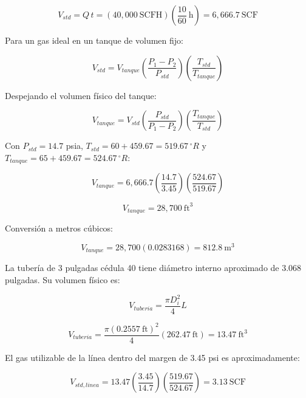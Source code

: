 \documentclass[12pt,letterpaper]{article}
\begin{document}
\begin{equation}
    V_{std}=Q\,t=(40{,}000\ \text{SCFH})\left(\frac{10}{60}\ \text{h}\right)=6{,}666.7\ \text{SCF}
\end{equation}

Para un gas ideal en un tanque de volumen fijo:

\begin{equation}
    V_{std}=V_{tanque}\left(\frac{P_1-P_2}{P_{std}}\right)\left(\frac{T_{std}}{T_{tanque}}\right)
\end{equation}

Despejando el volumen físico del tanque:

\begin{equation}
    V_{tanque}=V_{std}\left(\frac{P_{std}}{P_1-P_2}\right)\left(\frac{T_{tanque}}{T_{std}}\right)
\end{equation}

Con $P_{std}=14.7$ psia, $T_{std}=60+459.67=519.67\,^\circ R$ y $T_{tanque}=65+459.67=524.67\,^\circ R$:

\begin{equation}
    V_{tanque}=6{,}666.7\left(\frac{14.7}{3.45}\right)\left(\frac{524.67}{519.67}\right)
\end{equation}

\begin{equation}
    V_{tanque}=28{,}700\ \text{ft}^3
\end{equation}

Conversión a metros cúbicos:

\begin{equation}
    V_{tanque}=28{,}700(0.0283168)=812.8\ \text{m}^3
\end{equation}

La tubería de 3 pulgadas cédula 40 tiene diámetro interno aproximado de 3.068 pulgadas. Su volumen físico es:

\begin{equation}
    V_{tuberia}=\frac{\pi D_i^2}{4}L
\end{equation}

\begin{equation}
    V_{tuberia}=\frac{\pi(0.2557\ \text{ft})^2}{4}(262.47\ \text{ft})=13.47\ \text{ft}^3
\end{equation}

El gas utilizable de la línea dentro del margen de 3.45 psi es aproximadamente:

\begin{equation}
    V_{std,linea}=13.47\left(\frac{3.45}{14.7}\right)\left(\frac{519.67}{524.67}\right)=3.13\ \text{SCF}
\end{equation}
\end{document}
